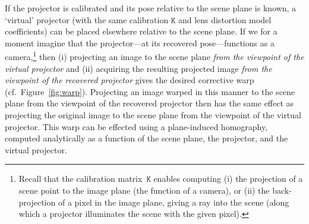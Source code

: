 \documentclass[review]{elsarticle}
\begin{document}
If the projector is calibrated and its pose relative to the scene plane is known, a `virtual' projector (with the same calibration $\mathtt{K}$ and lens distortion model coefficients) can be placed elsewhere relative to the scene plane. If we for a moment imagine that the projector---at its recovered pose---functions as a camera,\footnote{Recall that the calibration matrix~$\mathtt{K}$ enables computing (i) the projection of a scene point to the image plane (the function of a camera), or (ii) the back-projection of a pixel in the image plane, giving a ray into the scene (along which a projector illuminates the scene with the given pixel).} then (i) projecting an image to the scene plane \textit{from the viewpoint of the virtual projector} and (ii) acquiring the resulting projected image \textit{from the viewpoint of the recovered projector} gives the desired corrective warp (cf.\ Figure~\ref{fig:warp}). Projecting an image warped in this manner to the scene plane from the viewpoint of the recovered projector then has the same effect as projecting the original image to the scene plane from the viewpoint of the virtual projector. This warp can be effected using a plane-induced homography, computed analytically as a function of the scene plane, the projector, and the virtual projector.
\end{document}
